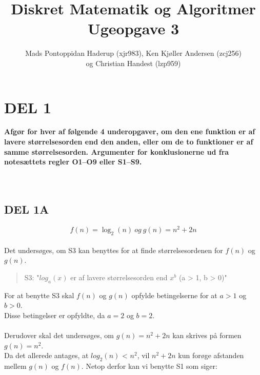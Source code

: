 \documentclass[a4paper]{article}
\title{Diskret Matematik og Algoritmer
\\Ugeopgave 3}
\author{Mads Pontoppidan Haderup (xjr983), Ken Kjøller Andersen (zcj256)\\
og Christian Handest (lzp959)}
\begin{document}
\maketitle %



\pagebreak
\section{DEL 1}

%
%
{\bfseries Afgør for hver af følgende 4 underopgaver, om den ene 
funktion er af lavere størrelsesorden end den anden, eller om de 
to funktioner er af samme størrelsesorden. Argumenter for 
konklusionerne ud fra notesættets regler O1–O9 eller S1–S9.} \\ \\ \\
%
\subsection{DEL 1A}
%
\[ f(n) = \log_{2}(n) \ og \ g(n) = n^2 + 2n \] \\
%
%
%
Det undersøges, om S3 kan benyttes for at finde størrelsesordenen for $f(n)$ og $g(n)$.
\begin{quotation}
S3: "$log_a(x)$ er af lavere størrelsesorden end $x^b$ (a > 1, b > 0)" \\
\end{quotation}
For at benytte S3 skal $f(n)$ og $g(n)$ opfylde betingelserne for at $a > 1$ og $b > 0$. \\
Disse betingelser er opfyldte, da $a = 2$ og $b = 2$. \\ \\
%
Derudover skal det undersøges, om $g(n) = n^2 +2n$ kan skrives på formen $g(n) = n^2$. \\
Da det allerede antages, at $log_2(n)$ < $n^2$, vil $n^2+2n$ kun forøge afstanden
mellem $g(n)$ og $f(n)$. Netop derfor kan vi benytte S1 som siger:
\end{document}
